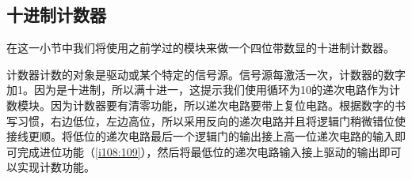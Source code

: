 \begin{figure}[!h]
\begin{center}
\qquad
{}
\qquad
{}
\end{center}
\caption{}
\label{i92:97}
\end{figure}

\subsection{十进制计数器}

在这一小节中我们将使用之前学过的模块来做一个四位带数显的十进制计数器。

计数器计数的对象是驱动或某个特定的信号源。信号源每激活一次，计数器的数字加1。因为是十进制，所以满十进一，这提示我们使用循环为10的递次电路作为计数模块。因为计数器要有清零功能，所以递次电路要带上复位电路。根据数字的书写习惯，右边低位，左边高位，所以采用反向的递次电路并且将逻辑门稍微错位使接线更顺。将低位的递次电路最后一个逻辑门的输出接上高一位递次电路的输入即可完成进位功能（\autoref{i108:109}），然后将最低位的递次电路输入接上驱动的输出即可以实现计数功能。

